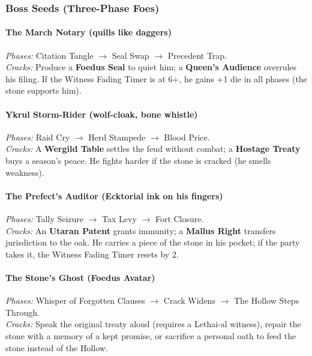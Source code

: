 \subsubsection{Boss Seeds (Three-Phase Foes)}

\paragraph{The March Notary (quills like daggers)}
\emph{Phases:} Citation Tangle $\rightarrow$ Seal Swap $\rightarrow$ Precedent Trap.\\
\emph{Cracks:} Produce a \textbf{Foedus Seal} to quiet him; a \textbf{Queen's Audience} overrules his filing. If the Witness Fading Timer is at 6+, he gains +1 die in all phases (the stone supports him).

\paragraph{Ykrul Storm-Rider (wolf-cloak, bone whistle)}
\emph{Phases:} Raid Cry $\rightarrow$ Herd Stampede $\rightarrow$ Blood Price.\\
\emph{Cracks:} A \textbf{Wergild Table} settles the feud without combat; a \textbf{Hostage Treaty} buys a season's peace. He fights harder if the stone is cracked (he smells weakness).

\paragraph{The Prefect's Auditor (Ecktorial ink on his fingers)}
\emph{Phases:} Tally Seizure $\rightarrow$ Tax Levy $\rightarrow$ Fort Closure.\\
\emph{Cracks:} An \textbf{Utaran Patent} grants immunity; a \textbf{Mallus Right} transfers jurisdiction to the oak. He carries a piece of the stone in his pocket; if the party takes it, the Witness Fading Timer resets by 2.

\paragraph{The Stone's Ghost (Foedus Avatar)}
\emph{Phases:} Whisper of Forgotten Clauses $\rightarrow$ Crack Widens $\rightarrow$ The Hollow Steps Through.\\
\emph{Cracks:} Speak the original treaty aloud (requires a Lethai-al witness), repair the stone with a memory of a kept promise, or sacrifice a personal oath to feed the stone instead of the Hollow.

